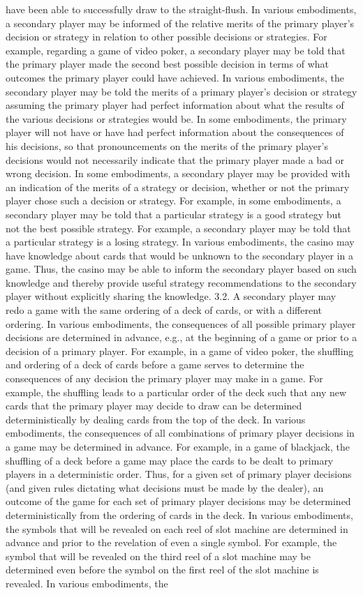 \documentclass[11pt,a4paper]{article}
\begin{document}
have been able to successfully draw to the straight-flush. In various embodiments, a secondary player may be informed of the relative merits of the primary player's decision or strategy in relation to other possible decisions or strategies. For example, regarding a game of video poker, a secondary player may be told that the primary player made the second best possible decision in terms of what outcomes the primary player could have achieved. In various embodiments, the secondary player may be told the merits of a primary player's decision or strategy assuming the primary player had perfect information about what the results of the various decisions or strategies would be. In some embodiments, the primary player will not have or have had perfect information about the consequences of his decisions, so that pronouncements on the merits of the primary player's decisions would not necessarily indicate that the primary player made a bad or wrong decision. In some embodiments, a secondary player may be provided with an indication of the merits of a strategy or decision, whether or not the primary player chose such a decision or strategy. For example, in some embodiments, a secondary player may be told that a particular strategy is a good strategy but not the best possible strategy. For example, a secondary player may be told that a particular strategy is a losing strategy. In various embodiments, the casino may have knowledge about cards that would be unknown to the secondary player in a game. Thus, the casino may be able to inform the secondary player based on such knowledge and thereby provide useful strategy recommendations to the secondary player without explicitly sharing the knowledge. 3.2. A secondary player may redo a game with the same ordering of a deck of cards, or with a different ordering. In various embodiments, the consequences of all possible primary player decisions are determined in advance, e.g., at the beginning of a game or prior to a decision of a primary player. For example, in a game of video poker, the shuffling and ordering of a deck of cards before a game serves to determine the consequences of any decision the primary player may make in a game. For example, the shuffling leads to a particular order of the deck such that any new cards that the primary player may decide to draw can be determined deterministically by dealing cards from the top of the deck. In various embodiments, the consequences of all combinations of primary player decisions in a game may be determined in advance. For example, in a game of blackjack, the shuffling of a deck before a game may place the cards to be dealt to primary players in a deterministic order. Thus, for a given set of primary player decisions (and given rules dictating what decisions must be made by the dealer), an outcome of the game for each set of primary player decisions may be determined deterministically from the ordering of cards in the deck. In various embodiments, the symbols that will be revealed on each reel of slot machine are determined in advance and prior to the revelation of even a single symbol. For example, the symbol that will be revealed on the third reel of a slot machine may be determined even before the symbol on the first reel of the slot machine is revealed. In various embodiments, the 
\end{document}
